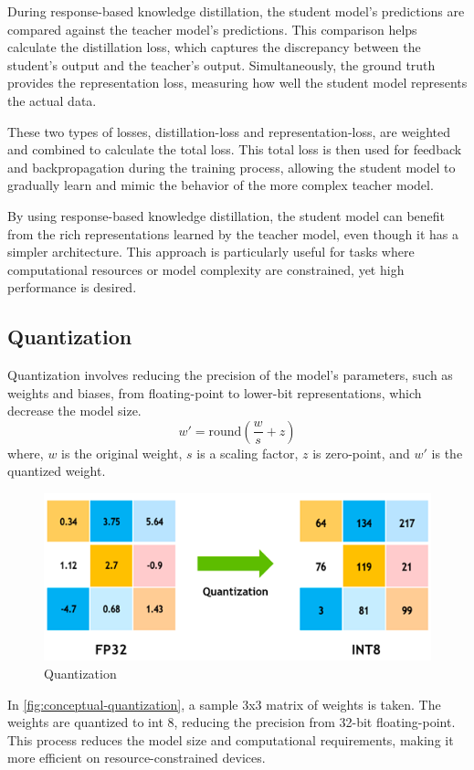 \documentclass{ioereport}
\begin{document}
    
    During response-based knowledge distillation, the student model's predictions are compared against the teacher model's predictions. This comparison helps calculate the distillation loss, which captures the discrepancy between the student's output and the teacher's output. Simultaneously, the ground truth provides the representation loss, measuring how well the student model represents the actual data.
    
    These two types of losses, distillation-loss and representation-loss, are weighted and combined to calculate the total loss. This total loss is then used for feedback and backpropagation during the training process, allowing the student model to gradually learn and mimic the behavior of the more complex teacher model.
    
    By using response-based knowledge distillation, the student model can benefit from the rich representations learned by the teacher model, even though it has a simpler architecture. This approach is particularly useful for tasks where computational resources or model complexity are constrained, yet high performance is desired.
      

    \subsection{Quantization}
    Quantization involves reducing the precision of the model's parameters, such as weights and biases, from floating-point to lower-bit representations, which decrease the model size.
    \begin{equation}
        w' = \text{round}\left(\frac{w}{s} + z \right)
    \end{equation}
    where, \( w \) is the original weight, \( s \) is a scaling factor, \( z \) is zero-point, and \( w' \) is the quantized weight.

    \begin{figure}[H]
            \centering
            \includegraphics[width=\linewidth]{assets/quantization.png}
            \caption{Quantization}
            \label{fig:conceptual-quantization}
    \end{figure}
    In \autoref{fig:conceptual-quantization}, a sample 3x3 matrix of weights is taken. The weights are quantized to int 8, reducing the precision from 32-bit floating-point. This process reduces the model size and computational requirements, making it more efficient on resource-constrained devices.
\end{document}
